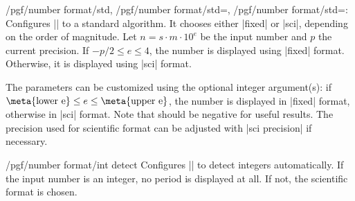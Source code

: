 \begin{keylist}{/pgf/number format/std,%
	/pgf/number format/std=,
	/pgf/number format/std=:}
Configures |\pgfmathprintnumber| to a standard algorithm. It chooses either |fixed| or |sci|, depending on the order of magnitude. Let $n=s \cdot m \cdot 10^e$ be the input number and $p$ the current precision. If $-p/2 \le e \le 4$, the number is displayed using |fixed| format. Otherwise, it is displayed using |sci| format. 

\begin{codeexample}[]
\hspace{1em}
\hspace{1em}
\hspace{1em}
\hspace{1em}
\end{codeexample}
The parameters can be customized using the optional integer argument(s): if $\text{\meta{lower e}} \le e \le \text{\meta{upper e}}$, the number is displayed in |fixed| format, otherwise in |sci| format. Note that  should be negative for useful results. The precision used for scientific format can be adjusted with |sci precision| if necessary.

\end{keylist}

\begin{key}{/pgf/number format/int detect}
Configures |\pgfmathprintnumber| to detect integers automatically. If the input number is an integer, no period is displayed at all. If not, the scientific format is chosen.

\begin{codeexample}[]
\hspace{1em}
\hspace{1em}
\hspace{1em}
\hspace{1em}
\end{codeexample}
\end{key}

